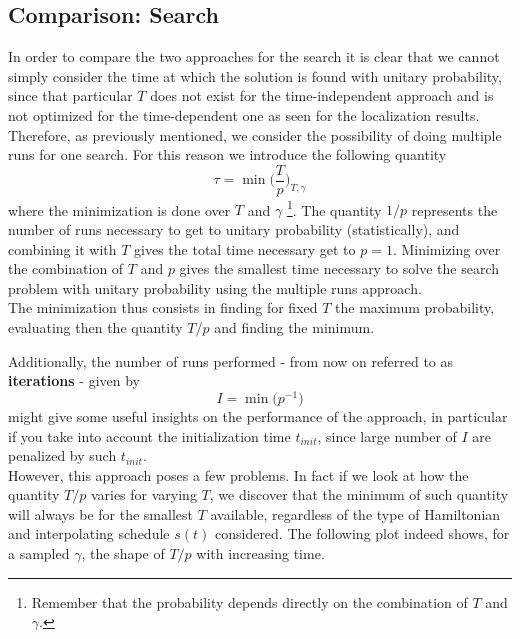    \subsection{Comparison: Search}
        In order to compare the two approaches for the search it is clear that we cannot simply consider the time at which the solution is found with unitary probability, since that particular $T$ does not exist for the time-independent approach and is not optimized for the time-dependent one as seen for the localization results. Therefore, as previously mentioned, we consider the possibility of doing multiple runs for one search. For this reason we introduce the following quantity
        \begin{equation}
          \tau = \min\bigg(\frac{T}{p}\bigg)_{T, \gamma}
        \end{equation}
        where the minimization is done over $T$ and $\gamma$ \footnote{Remember that the probability depends directly on the combination of $T$ and $\gamma$.}. The quantity $1/p$ represents the number of runs necessary to get to unitary probability (statistically), and combining it with $T$ gives the total time necessary get to $p=1$. Minimizing over the combination of $T$ and $p$ gives the smallest time necessary to solve the search problem with unitary probability using the multiple runs approach.\\ The minimization thus consists in finding for fixed $T$ the maximum probability, evaluating then the quantity $T/p$ and finding the minimum.

        \noindent
        Additionally, the number of runs performed - from now on referred to as \textbf{iterations} - given by
        \begin{equation}
          I = \min\big(p^{-1}\big)
        \end{equation}
        might give some useful insights on the performance of the approach, in particular if you take into account the initialization time $t_{init}$, since large number of $I$ are penalized by such $t_{init}$.\\


        \noindent
        However, this approach poses a few problems. In fact if we look at how the quantity $T/p$ varies for varying $T$, we discover that the minimum of such quantity will always be for the smallest $T$ available, regardless of the type of Hamiltonian and interpolating schedule $s(t)$ considered. The following plot indeed shows, for a sampled $\gamma$, the shape of $T/p$ with increasing time. \\
        \clearpage
        

